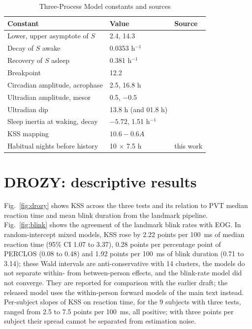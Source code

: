 \documentclass[journal]{IEEEtran}
\begin{document}
\begin{table}[h]
  \centering
  \caption{Three-Process Model constants and sources}
  \label{tab:tpm}
  \footnotesize
  \begin{tabular}{@{}lll@{}}
    \toprule
    Constant & Value & Source \\
    \midrule
    Lower, upper asymptote of $S$ & 2.4, 14.3 & \cite{akerstedt2004predictions,ingre2014validating} \\
    Decay of $S$ awake & 0.0353 h$^{-1}$ & \cite{akerstedt2004predictions,ingre2014validating} \\
    Recovery of $S$ asleep & 0.381 h$^{-1}$ & \cite{akerstedt2004predictions,ingre2014validating} \\
    Breakpoint & 12.2 & \cite{akerstedt2008accounting,ingre2014validating} \\
    Circadian amplitude, acrophase & 2.5, 16.8 h & \cite{akerstedt2004predictions,ingre2014validating} \\
    Ultradian amplitude, mesor & 0.5, $-0.5$ & \cite{ingre2014validating} \\
    Ultradian dip & 13.8 h (and 01.8 h) & \cite{akerstedt2004predictions} \\
    Sleep inertia at waking, decay & $-5.72$, 1.51 h$^{-1}$ & \cite{ingre2014validating} \\
    KSS mapping & $10.6 - 0.6A$ & \cite{ingre2014validating} \\
    Habitual nights before history & 10 $\times$ 7.5 h & this work \\
    \bottomrule
  \end{tabular}
\end{table}

\section{DROZY: descriptive results}
\label{sec:drozy}
Fig.~\ref{fig:drozy} shows KSS across the three tests and its relation to PVT median reaction time and mean blink duration from the landmark pipeline. Fig.~\ref{fig:blink} shows the agreement of the landmark blink rates with EOG. In random-intercept mixed models, KSS rose by 2.22 points per 100~ms of median reaction time (95\% CI 1.07 to 3.37), 0.28 points per percentage point of PERCLOS (0.08 to 0.48) and 1.92 points per 100~ms of blink duration (0.71 to 3.14); these Wald intervals are anti-conservative with 14 clusters, the models do not separate within- from between-person effects, and the blink-rate model did not converge. They are reported for comparison with the earlier draft; the released model uses the within-person forward models of the main text instead. Per-subject slopes of KSS on reaction time, for the 9 subjects with three tests, ranged from 2.5 to 7.5 points per 100~ms, all positive; with three points per subject their spread cannot be separated from estimation noise.
\end{document}

